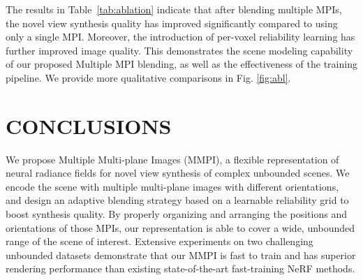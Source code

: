 \documentclass[letterpaper, 10 pt, conference]{ieeeconf}  %
\begin{document}
The results in Table~\ref{tab:ablation} indicate that after blending multiple MPIs, the novel view synthesis quality has improved significantly compared to using only a single MPI. Moreover, the introduction of per-voxel reliability learning has further improved image quality. This demonstrates the scene modeling capability of our proposed Multiple MPI blending, as well as the effectiveness of the training pipeline. We provide more qualitative comparisons in Fig. \ref{fig:abl}.






\section{CONCLUSIONS}

We propose Multiple Multi-plane Images (MMPI), a flexible representation of neural radiance fields for novel view synthesis of complex unbounded scenes.
We encode the scene with multiple multi-plane images with different orientations, and design an adaptive blending strategy based on a learnable reliability grid to boost synthesis quality.
By properly organizing and arranging the positions and orientations of those MPIs, our representation is able to cover a wide, unbounded range of the scene of interest.
Extensive experiments on two challenging unbounded datasets demonstrate that our MMPI is fast to train and has superior rendering performance than existing state-of-the-art fast-training NeRF methods.










\end{document}
